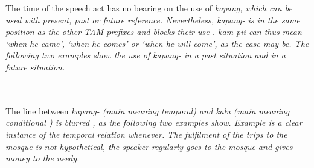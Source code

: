 
The time of the speech act has no bearing on the use of \em kapang\em, which can be used with present, past or future reference. Nevertheless, \em kapang- \em is in the same position as the other TAM-prefixes and blocks their use \citep[cf.]{Slomanson2008ismil}. \em kam-pii \em can thus mean `when he came', `when he comes' or `when he will come', as the case may be. The following two examples show the use of \em kapang- \em in a past situation  and in a future situation.

 \\
 \\ 
The line between \em kapang- \em (main meaning temporal) and \em kalu \em (main meaning conditional ) is blurred \citep[cf.][]{Slomanson2008ismil}, as the following two examples show. Example  is a clear instance of the temporal relation \em whenever\em. The fulfilment of the trips to the mosque is not hypothetical, the speaker regularly goes to the mosque and gives money to the needy.
 

